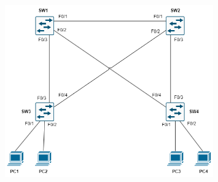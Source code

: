 \documentclass[a4paper]{book}
\begin{document}
\begin{figure}[h]
	\centering
	\includegraphics[width=0.8\textwidth]{img/rstp.png}
	\caption{\textit{}}
\end{figure}
\end{document}
